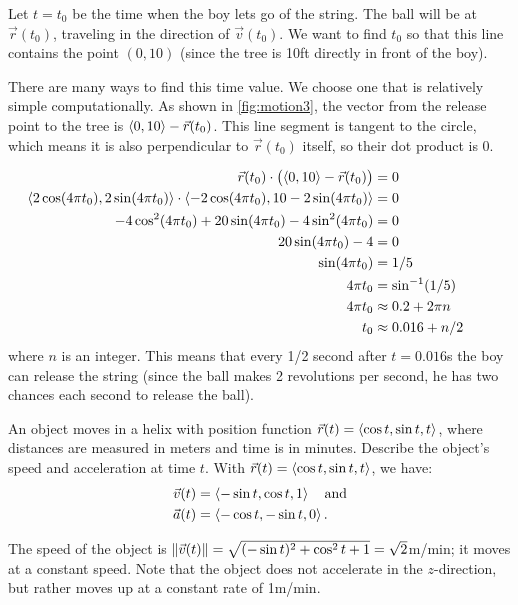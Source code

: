 \begin{example}
\begin{enumerate}
	Let $t=t_0$ be the time when the boy lets go of the string. The ball will be at $\vec r(t_0)$, traveling in the direction of $\vec v(t_0)$. We want to find $t_0$ so that this line contains the point $(0,10)$ (since the tree is 10ft directly in front of the boy).
	
	There are many ways to find this time value. We choose one that is relatively simple computationally. As shown in \autoref{fig:motion3}, the vector from the release point to the tree is $\left\langle 0,10\right\rangle- \vec r(t_0)$. This line segment is tangent to the circle, which means it is also perpendicular to $\vec r(t_0)$ itself, so their dot product is 0.
	
	\begin{align*}
	\vec r(t_0) \cdot \bigl(\bracket{0,10}- \vec r(t_0)\bigr) &=0\\
	\hspace{-2em}
	\bracket{2\cos (4\pi t_0), 2\sin (4\pi t_0)}\cdot\bracket{-2\cos(4\pi t_0),10-2\sin (4\pi t_0)}&=0\\
	-4\cos^2(4\pi t_0) + 20\sin (4\pi t_0)-4\sin^2(4\pi t_0) &= 0\\
	20\sin (4\pi t_0) - 4 &=0\\
	\sin (4\pi t_0) &=1/5\\
	4\pi t_0 &= \sin^{-1}(1/5)\\
	4\pi t_0 &\approx 0.2 + 2\pi n\\%
	t_0 &\approx 0.016 + n/2
	\end{align*}
	where $n$ is an integer.
	This means that every 1/2 second after $t=0.016$s the boy can release the string (since the ball makes 2 revolutions per second, he has two chances each second to release the ball).
\end{enumerate}
\end{example}

\begin{example}\label{ex_motion4}%
An object moves in a helix with position function $\vec r(t) =\left\langle \cos t, \sin t, t\right\rangle$, where distances are measured in meters and time is in minutes. Describe the object's speed and acceleration at time $t$.
\solution
With $\vec r(t) =\left\langle \cos t,\sin t, t\right\rangle$, we have:
\begin{align*}
\vec v(t) &=\left\langle -\sin t, \cos t, 1\right\rangle\quad \text{and} \\
\vec a(t) &=\left\langle -\cos t, -\sin t, 0\right\rangle.
\end{align*}

The speed of the object is $\left\lVert \vec v(t) \right\rVert = \sqrt{(-\sin t)^2+\cos^2t+1} = \sqrt{2}$m/min; it moves at a constant speed. Note that the object does not accelerate in the $z$-direction, but rather moves up at a constant rate of 1m/min.
\end{example}

